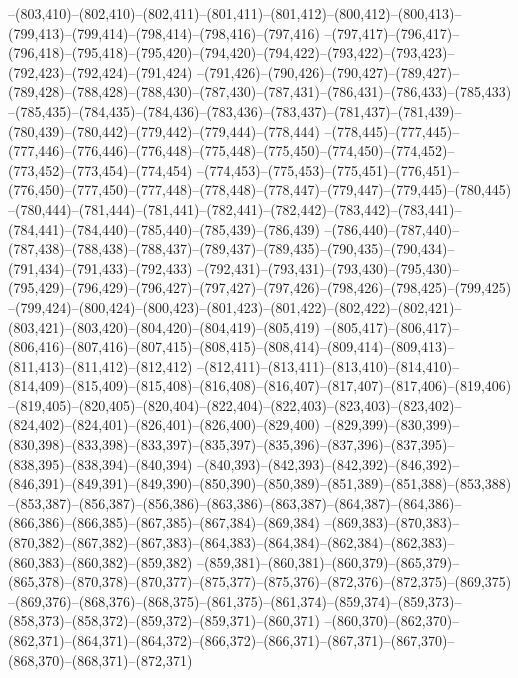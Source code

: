 --(803,410)--(802,410)--(802,411)--(801,411)--(801,412)--(800,412)--(800,413)--(799,413)--(799,414)--(798,414)--(798,416)--(797,416)
--(797,417)--(796,417)--(796,418)--(795,418)--(795,420)--(794,420)--(794,422)--(793,422)--(793,423)--(792,423)--(792,424)--(791,424)
--(791,426)--(790,426)--(790,427)--(789,427)--(789,428)--(788,428)--(788,430)--(787,430)--(787,431)--(786,431)--(786,433)--(785,433)
--(785,435)--(784,435)--(784,436)--(783,436)--(783,437)--(781,437)--(781,439)--(780,439)--(780,442)--(779,442)--(779,444)--(778,444)
--(778,445)--(777,445)--(777,446)--(776,446)--(776,448)--(775,448)--(775,450)--(774,450)--(774,452)--(773,452)--(773,454)--(774,454)
--(774,453)--(775,453)--(775,451)--(776,451)--(776,450)--(777,450)--(777,448)--(778,448)--(778,447)--(779,447)--(779,445)--(780,445)
--(780,444)--(781,444)--(781,441)--(782,441)--(782,442)--(783,442)--(783,441)--(784,441)--(784,440)--(785,440)--(785,439)--(786,439)
--(786,440)--(787,440)--(787,438)--(788,438)--(788,437)--(789,437)--(789,435)--(790,435)--(790,434)--(791,434)--(791,433)--(792,433)
--(792,431)--(793,431)--(793,430)--(795,430)--(795,429)--(796,429)--(796,427)--(797,427)--(797,426)--(798,426)--(798,425)--(799,425)
--(799,424)--(800,424)--(800,423)--(801,423)--(801,422)--(802,422)--(802,421)--(803,421)--(803,420)--(804,420)--(804,419)--(805,419)
--(805,417)--(806,417)--(806,416)--(807,416)--(807,415)--(808,415)--(808,414)--(809,414)--(809,413)--(811,413)--(811,412)--(812,412)
--(812,411)--(813,411)--(813,410)--(814,410)--(814,409)--(815,409)--(815,408)--(816,408)--(816,407)--(817,407)--(817,406)--(819,406)
--(819,405)--(820,405)--(820,404)--(822,404)--(822,403)--(823,403)--(823,402)--(824,402)--(824,401)--(826,401)--(826,400)--(829,400)
--(829,399)--(830,399)--(830,398)--(833,398)--(833,397)--(835,397)--(835,396)--(837,396)--(837,395)--(838,395)--(838,394)--(840,394)
--(840,393)--(842,393)--(842,392)--(846,392)--(846,391)--(849,391)--(849,390)--(850,390)--(850,389)--(851,389)--(851,388)--(853,388)
--(853,387)--(856,387)--(856,386)--(863,386)--(863,387)--(864,387)--(864,386)--(866,386)--(866,385)--(867,385)--(867,384)--(869,384)
--(869,383)--(870,383)--(870,382)--(867,382)--(867,383)--(864,383)--(864,384)--(862,384)--(862,383)--(860,383)--(860,382)--(859,382)
--(859,381)--(860,381)--(860,379)--(865,379)--(865,378)--(870,378)--(870,377)--(875,377)--(875,376)--(872,376)--(872,375)--(869,375)
--(869,376)--(868,376)--(868,375)--(861,375)--(861,374)--(859,374)--(859,373)--(858,373)--(858,372)--(859,372)--(859,371)--(860,371)
--(860,370)--(862,370)--(862,371)--(864,371)--(864,372)--(866,372)--(866,371)--(867,371)--(867,370)--(868,370)--(868,371)--(872,371)
